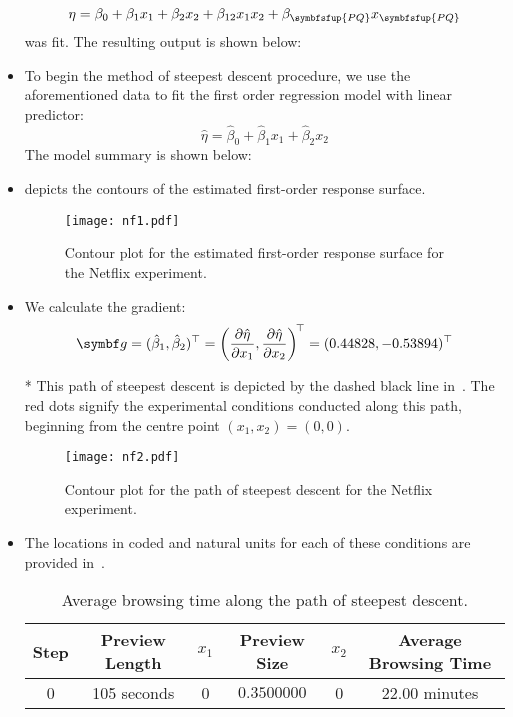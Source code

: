\begin{itemize}
          \[ \eta=\beta_0+\beta_1x_1+\beta_2x_2+\beta_{12}x_1x_2+\beta_{\symbfsfup{PQ}}x_{\symbfsfup{PQ}} \]
          was fit. The resulting output is shown below:
          
    \item To begin the method of steepest descent procedure, we use the aforementioned data to fit the first
          order regression model with linear predictor:
          \[ \hat{\eta}=\hat{\beta}_0+\hat{\beta}_1x_1+\hat{\beta}_2x_2 \]
          The model summary is shown below:
          
    \item {} depicts the contours of the estimated first-order response surface.
          \begin{figure}[!htbp]
              \centering
              \texttt{[image: nf1.pdf]}
              \caption{Contour plot for the estimated first-order response surface for the Netflix experiment.}\label{fig:nf1}
          \end{figure}
    \item We calculate the gradient:
          \[ \Vector{g}=(\hat{\beta}_1,\hat{\beta}_2)^\top=\biggl(\pdv{\hat{\eta}}{x_1},\pdv{\hat{\eta}}{x_2}\biggr)^{\!\top}=(0.44828,-0.53894)^\top \]
    \item[*] This path of steepest descent is depicted by the dashed black line in~. The red dots signify
        the experimental conditions conducted along this path, beginning from the centre point $ (x_1,x_2)=(0,0) $.
        \begin{figure}[!htbp]
            \centering
            \texttt{[image: nf2.pdf]}
            \caption{Contour plot for the path of steepest descent for the Netflix experiment.}\label{fig:nf2}
        \end{figure}
    \item The locations in coded and natural units for each of these conditions are provided in~.
          \begin{table}[!htbp]
              \centering
              \caption{Average browsing time along the path of steepest descent.}\label{tab:netflixtab2}
              \begin{tabular}{cccccc}
                  \toprule Step & Preview Length & $x_{1}$  & Preview Size & $x_{2}$     & Average Browsing Time \\
                  \midrule 0    & 105 seconds    & 0        & $0.3500000$  & 0           & $22.00$ minutes       \\

\end{tabular}
\end{table}
\end{itemize}
